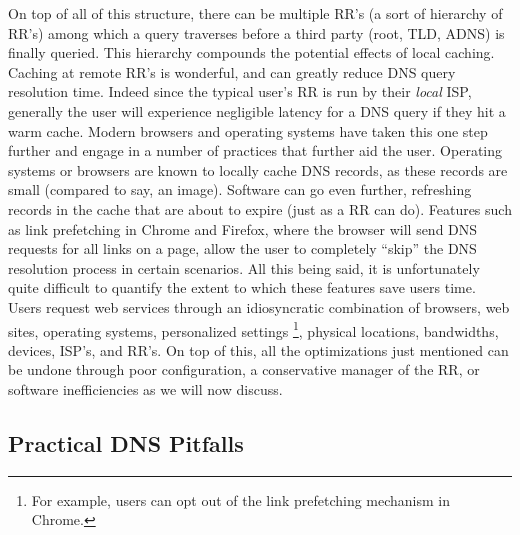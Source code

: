 \documentclass[sigconf,nonacm,10pt]{acmart}
\begin{document}
On top of all of this structure, there can be multiple RR's (a sort of
hierarchy of RR's) among which a query traverses before a third party
(root, TLD, ADNS) is finally queried. This hierarchy compounds the
potential effects of local caching. \break \break
Caching at remote RR's is wonderful, and can greatly reduce DNS query
resolution time. Indeed since the typical user's RR is run by their
\textit{local} ISP, generally the user will experience negligible
latency for a DNS query if they hit a warm cache. Modern browsers and
operating systems have taken this one step further and engage in a
number of practices that further aid the user. Operating systems or
browsers are known to locally cache DNS records, as these records are
small (compared to say, an image). Software can go even further,
refreshing records in the cache that are about to expire (just as a RR
can do). Features such as link prefetching in Chrome and Firefox, where
the browser will send DNS requests for all links on a page, allow the
user to completely ``skip'' the DNS resolution process in certain
scenarios. All this being said, it is unfortunately quite difficult to
quantify the extent to which these features save users time. Users
request web services through an idiosyncratic combination of browsers,
web sites, operating systems, personalized settings
\footnote{ For example, users can opt out of the link prefetching mechanism in Chrome. },
physical locations, bandwidths, devices, ISP's, and RR's. On top of
this, all the optimizations just mentioned can be undone through poor
configuration, a conservative manager of the RR, or software
inefficiencies as we will now discuss.

\subsection{Practical DNS Pitfalls}\label{practical-dns-pitfalls-1}
\end{document}
